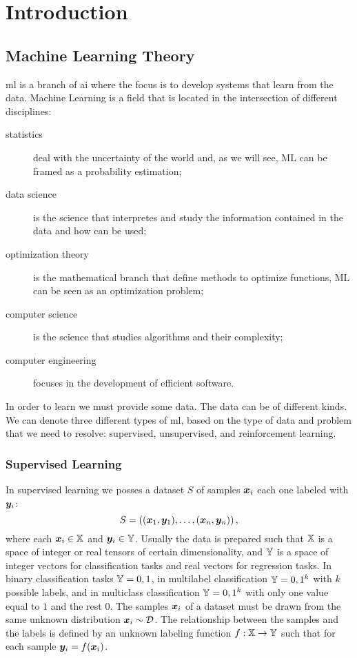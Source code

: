 \chapter{Introduction}
\label{ch:introduction}

\section{Machine Learning Theory}
\ac{ml} is a branch of \ac{ai}
where the focus is to develop systems that learn from the
data. Machine Learning is a field that is located in the intersection
of different disciplines:
\begin{description}
\item[statistics] deal with the uncertainty of the world and, as we
  will see, ML can be framed as a probability estimation;
\item[data science] is the science that interpretes and study the
  information contained in the data and how can be used;
\item[optimization theory] is the mathematical branch that define
  methods to optimize functions, ML can be seen as an optimization
  problem;
\item[computer science] is the science that studies algorithms and
  their complexity;
\item[computer engineering] focuses in the development of efficient
  software.
\end{description}

In order to learn we must provide some data. The data can be of
different kinds. We can denote three different types of \ac{ml}, based
on the type of data and problem that we need to resolve: supervised,
unsupervised, and reinforcement learning.

\subsection{Supervised Learning}
In supervised learning we posses a dataset $S$ of samples $\bm{x}_i$
each one labeled with $\bm{y}_i$:
\begin{equation*}
  S=\left((\bm{x}_1,\bm{y}_1),\dots,(\bm{x}_n,\bm{y}_n)\right),
\end{equation*}
where each $\bm{x}_i\in\mathbb{X}$ and $\bm{y}_i\in\mathbb{Y}$. Usually the
data is prepared such that $\mathbb{X}$ is a space of integer or real
tensors of certain dimensionality, and $\mathbb{Y}$ is a space of integer
vectors for classification tasks and real vectors for regression
tasks. In binary classification tasks $\mathbb{Y}={0,1}$, in multilabel
classification $\mathbb{Y}={0,1}^k$ with $k$ possible labels, and in
multiclass classification $\mathbb{Y}={0,1}^k$ with only one value equal to
$1$ and the rest $0$. The samples $\bm{x}_i$ of a dataset must be
drawn from the same unknown distribution $\bm{x}_i\sim\mathcal{D}$. The
relationship between the samples and the labels is defined by an unknown
labeling function $f:\mathbb{X}\rightarrow\mathbb{Y}$ such that for each sample
$\bm{y}_i=f(\bm{x}_i)$.

